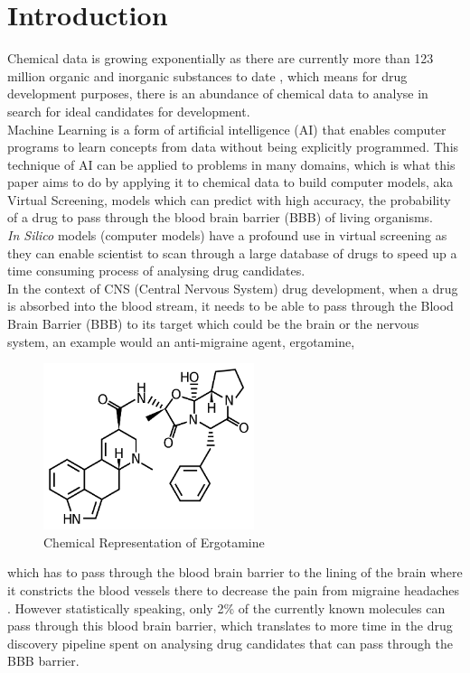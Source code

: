 \documentclass[a4paper,12pt]{report}
\begin{document}
\chapter{Introduction}
	Chemical data is growing exponentially as there are currently more than 123 million organic and inorganic substances to date \cite{CAS2016}, which means for drug development purposes, there is an abundance of chemical data to analyse in search for ideal candidates for development. \\
	Machine Learning is a form of artificial intelligence (AI) that enables computer programs to learn concepts from data without being explicitly programmed. This technique of AI can be applied to problems in many domains, which is what this paper aims to do by applying it to chemical data to build computer models, aka Virtual Screening, models which can predict with high accuracy, the probability of a drug to pass through the blood brain barrier (BBB) of living organisms. \\
	\textit{In Silico} models (computer models) have a profound use in virtual screening as they can enable scientist to scan through a large database of drugs to speed up a time consuming process of analysing drug candidates. \\
	In the context of CNS (Central Nervous System) drug development, when a drug is absorbed into the blood stream, it needs to be able to pass through the Blood Brain Barrier (BBB) to its target which could be the brain or the nervous system, an example would an anti-migraine agent, ergotamine, 
		\begin{figure}[H]
			\centering
			\includegraphics[scale=1,width=0.55\textwidth,totalheight=0.3\textheight]{images/Ergotamine-skeletal} 
			\caption{Chemical Representation of Ergotamine}
			\label{fig:ergotamine}
		\end{figure}
	which has to pass through the blood brain barrier to the lining of the brain where it constricts the blood vessels there to decrease the pain from migraine headaches \cite{DrugsCom}. 
	However statistically speaking, only 2\% of the currently known molecules can pass through this blood brain barrier, which translates to more time in the drug discovery pipeline spent on analysing drug candidates that can pass through the BBB barrier. \\
\end{document}
